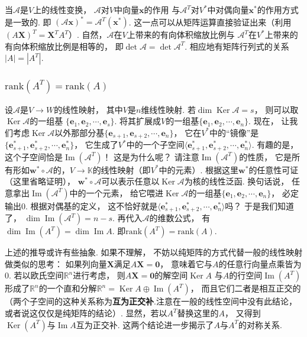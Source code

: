 当$\mathcal{A}$是$V$上的线性变换，
$\mathcal{A}$对$V$中向量$\bm{x}$的作用
与$\mathcal{A}^T$对$V^*$中对偶向量$\bm{x}^*$的作用方式是一致的.
即
$(\mathcal{A} \bm{x})^* 
= \mathcal{A}^T (\bm{x}^*)$.
这一点可以从矩阵运算直接验证出来（利用$(A\bm{X})^T = \bm{X}^T A^T$）.
自然，$\mathcal{A}$在$V$上带来的有向体积缩放比例与
$\mathcal{A}^T$在$V^*$上带来的有向体积缩放比例是相等的，
即$\det \mathcal{A} = \det \mathcal{A}^T$.
相应地有矩阵行列式的关系$|A| = |A^T|$.


\subsubsection{$\mathrm{rank}(A^T) = \mathrm{rank} (A)$}


设$\mathcal{A}$是$V \to W$的线性映射，
其中$V$是$n$维线性映射.
若$\dim \operatorname{Ker} \mathcal{A} = s$，
则可以取$\operatorname{Ker}\mathcal{A}$的一组基
$\{ \bm{e}_1 , \bm{e}_2 , \cdots , \bm{e}_{s} \}$.
将其扩展成$V$的一组基$\{  \bm{e}_1 , \bm{e}_2 , \cdots , \bm{e}_{n} \}$.
现在，
让我们考虑$\operatorname{Ker}\mathcal{A}$以外那部分基$\{ \bm{e}_{s+1}, \bm{e}_{s+2}, \cdots , \bm{e}_n \}$，
它在$V^*$中的“镜像”是
$\{ \bm{e}_{s+1}^*, \bm{e}_{s+2}^*, \cdots , \bm{e}_n^* \}$，
它生成了$V^*$中的一个子空间$\langle \bm{e}_{s+1}^*, \bm{e}_{s+2}^*, \cdots , \bm{e}_n^* \rangle$.
有趣的是，
这个子空间恰是$\operatorname{Im}(\mathcal{A}^T)$！
这是为什么呢？
请注意$\operatorname{Im}(\mathcal{A}^T)$的性质，
它是所有形如$\bm{w}^* \circ \mathcal{A}$的，$V \to \mathbb{K}$的线性映射（即$V^*$中的元素）.
根据这里$\bm{w}^*$的任意性可证（这里省略证明），
$\bm{w}^* \circ \mathcal{A}$可以表示任意以$\operatorname{Ker}\mathcal{A}$为核的线性泛函.
换句话说，
任意拿出$\operatorname{Im}(\mathcal{A}^T)$中的一个元素，
给它喂进$\operatorname{Ker}\mathcal{A}$的一组基$\{  \bm{e}_1 , \bm{e}_2 , \cdots , \bm{e}_{n} \}$，
必定输出$0$.
根据对偶基的定义，
这不恰好就是$\langle \bm{e}_{s+1}^*, \bm{e}_{s+2}^*, \cdots , \bm{e}_n^* \rangle$吗？
于是我们知道了，
$\dim \operatorname{Im} (\mathcal{A}^T) = n-s$.
再代入$\mathcal{A}$的维数公式，
有$\dim \operatorname{Im} (A^T) = \dim \operatorname{Im} A$.
即$\mathrm{rank}(A^T) = \mathrm{rank}(A)$.

上述的推导或许有些抽象.
如果不理解，
不妨以纯矩阵的方式代替一般的线性映射做类似的思考：
如果列向量$\bm{X}$满足$A\bm{X} = \bm{0}$，
意味着它与$A$的任意行向量点乘皆为$0$.
若以欧氏空间$\mathbb{R}^n$进行考虑，
则$A\bm{X} = \bm{0}$的解空间$\operatorname{Ker}A$
与$A$的行空间$\operatorname{Im}(A^T)$
形成了$\mathbb{R}^n$的一个直和分解$\mathbb{R}^n = \operatorname{Ker}A \oplus \operatorname{Im}(A^T)$，
而且它们二者是相互正交的（两个子空间的这种关系称为\textbf{互为正交补}.注意在一般的线性空间中没有此结论，或者说这仅仅是纯矩阵的结论）.
显然，若以$A^T$替换这里的$A$，
又得到$\operatorname{Ker} (A^T)$与$\operatorname{Im}A$互为正交补.
这两个结论进一步揭示了$A$与$A^T$的对称关系.

